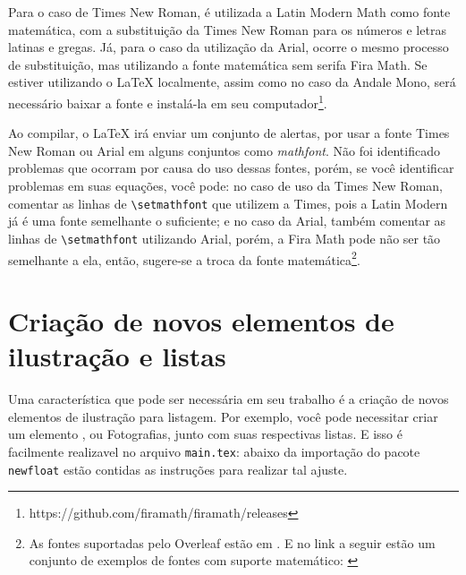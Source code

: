 Para o caso de Times New Roman, é utilizada a Latin Modern Math como fonte matemática, com a substituição da Times New Roman para os números e letras latinas e gregas. Já, para o caso da utilização da Arial, ocorre o mesmo processo de substituição, mas utilizando a fonte matemática sem serifa Fira Math. Se estiver utilizando o \LaTeX{} localmente, assim como no caso da Andale Mono, será necessário baixar a fonte e instalá-la em seu computador\footnote{https://github.com/firamath/firamath/releases}.

Ao compilar, o \LaTeX{} irá enviar um conjunto de alertas, por usar a fonte Times New Roman ou Arial em alguns conjuntos como \textit{mathfont}. Não foi identificado problemas que ocorram por causa do uso dessas fontes, porém, se você identificar problemas em suas equações, você pode: no caso de uso da Times New Roman, comentar as linhas de \verb|\setmathfont| que utilizem a Times, pois a Latin Modern já é uma fonte semelhante o suficiente; e no caso da Arial, também comentar as linhas de \verb|\setmathfont| utilizando Arial, porém, a Fira Math pode não ser tão semelhante a ela, então, sugere-se a troca da fonte matemática\footnote{As fontes suportadas pelo Overleaf estão em \textcite{site:overleaf-fontes-2023}. E no link a seguir estão um conjunto de exemplos de fontes com suporte matemático: \textcite{site:tex-fontes-2022}}.

\section{Criação de novos elementos de ilustração e listas}\label{section:novos-elementos}
Uma característica que pode ser necessária em seu trabalho é a criação de novos elementos de ilustração para listagem. Por exemplo, você pode necessitar criar um elemento , ou Fotografias, junto com suas respectivas listas. E isso é facilmente realizavel no arquivo \texttt{main.tex}: abaixo da importação do pacote \texttt{newfloat} estão contidas as instruções para realizar tal ajuste.

